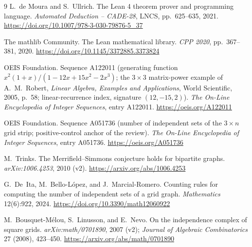 \documentclass[11pt]{article}
\begin{document}
\begin{thebibliography}{9}
L.~de Moura and S.~Ullrich.
\newblock The Lean 4 theorem prover and programming language.
\newblock \emph{Automated Deduction -- CADE-28}, LNCS, pp.~625--635, 2021.
\url{https://doi.org/10.1007/978-3-030-79876-5_37}

The mathlib Community.
\newblock The Lean mathematical library.
\newblock \emph{CPP 2020}, pp.~367--381, 2020.
\url{https://doi.org/10.1145/3372885.3373824}

OEIS Foundation.
\newblock Sequence A122011 (generating function $x^2(1+x)/(1-12x+15x^2-2x^3)$;
the $3\times3$ matrix-power example of A.~M.~Robert, \emph{Linear Algebra,
Examples and Applications}, World Scientific, 2005, p.~58; linear-recurrence
index, signature $(12,-15,2)$).
\newblock \emph{The On-Line Encyclopedia of Integer Sequences}, entry
A122011.
\url{https://oeis.org/A122011}

OEIS Foundation.
\newblock Sequence A051736 (number of independent sets of the $3\times n$
grid strip; positive-control anchor of the review).
\newblock \emph{The On-Line Encyclopedia of Integer Sequences}, entry
A051736.
\url{https://oeis.org/A051736}

M.~Trinks.
\newblock The Merrifield--Simmons conjecture holds for bipartite graphs.
\newblock \emph{arXiv:1006.4253}, 2010 (v2).
\url{https://arxiv.org/abs/1006.4253}

G.~De~Ita, M.~Bello-L\'opez, and J.~Marcial-Romero.
\newblock Counting rules for computing the number of independent sets of a
grid graph.
\newblock \emph{Mathematics} 12(6):922, 2024.
\url{https://doi.org/10.3390/math12060922}

M.~Bousquet-M\'elou, S.~Linusson, and E.~Nevo.
\newblock On the independence complex of square grids.
\newblock \emph{arXiv:math/0701890}, 2007 (v2); \emph{Journal of Algebraic
Combinatorics} 27 (2008), 423--450.
\url{https://arxiv.org/abs/math/0701890}

\end{thebibliography}
\end{document}
